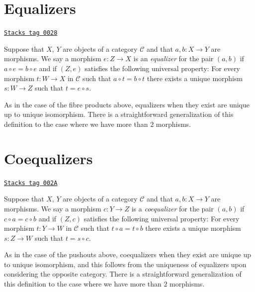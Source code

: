 \section{Equalizers}
\label{categories-section-equalizers}
\begin{definition}[Equalizers]
\label{categories-definition-equalizers}
\href{https://stacks.math.columbia.edu/tag/0028}{\texttt{Stacks tag 0028}}

Suppose that $X$, $Y$ are objects of a category $\mathcal{C}$
and that $a, b : X \to Y$ are morphisms. We say a morphism
$e : Z \to X$ is an {\it equalizer} for the pair $(a, b)$ if
$a \circ e = b \circ e$ and if $(Z, e)$ satisfies the following
universal property: For every morphism $t : W \to X$
in $\mathcal{C}$ such that $a \circ t = b \circ t$ there exists
a unique morphism $s : W \to Z$ such that $t = e \circ s$.
\end{definition}

As in the case of the fibre products above, equalizers when
they exist are unique up to unique isomorphism. There is a
straightforward generalization of this definition to the
case where we have more than $2$ morphisms.

\section{Coequalizers}
\label{categories-section-coequalizers}
\begin{definition}[Coequalizers]
\label{categories-definition-coequalizers}
\href{https://stacks.math.columbia.edu/tag/002A}{\texttt{Stacks tag 002A}}

Suppose that $X$, $Y$ are objects of a category $\mathcal{C}$
and that $a, b : X \to Y$ are morphisms. We say a morphism
$c : Y \to Z$ is a {\it coequalizer} for the pair $(a, b)$ if
$c \circ a = c \circ b$ and if $(Z, c)$ satisfies the following
universal property: For every morphism $t : Y \to W$
in $\mathcal{C}$ such that $t \circ a = t \circ b$ there exists
a unique morphism $s : Z \to W$ such that $t = s \circ c$.
\end{definition}

As in the case of the pushouts above, coequalizers when
they exist are unique up to unique isomorphism, and this follows
from the uniqueness of equalizers upon considering the opposite
category. There is a straightforward generalization of this definition
to the case where we have more than $2$ morphisms.

